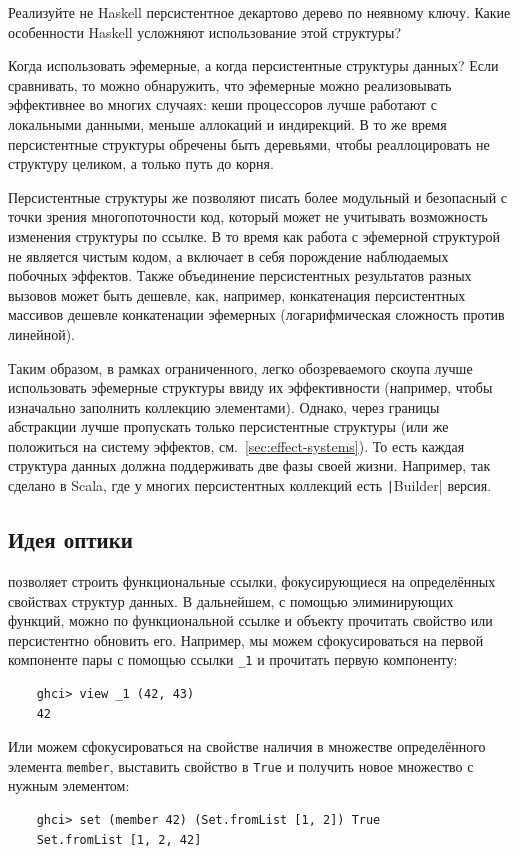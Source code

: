 \begin{task}
    Реализуйте не Haskell персистентное декартово дерево по неявному ключу.
    Какие особенности Haskell усложняют использование этой структуры?
\end{task}

Когда использовать эфемерные, а когда персистентные структуры данных?
Если сравнивать, то можно обнаружить, что эфемерные можно реализовывать эффективнее во многих случаях: кеши процессоров лучше работают с локальными данными, меньше аллокаций и индирекций.
В то же время персистентные структуры обречены быть деревьями, чтобы реаллоцировать не структуру целиком, а только путь до корня.

Персистентные структуры же позволяют писать более модульный и безопасный с точки зрения многопоточности код, который может не учитывать возможность изменения структуры по ссылке.
В то время как работа с эфемерной структурой не является чистым кодом, а включает в себя порождение наблюдаемых побочных эффектов.
Также объединение персистентных результатов разных вызовов может быть дешевле, как, например, конкатенация персистентных массивов дешевле конкатенации эфемерных (логарифмическая сложность против линейной).

Таким образом, в рамках ограниченного, легко обозреваемого скоупа лучше использовать эфемерные структуры ввиду их эффективности (например, чтобы изначально заполнить коллекцию элементами).
Однако, через границы абстракции лучше пропускать только персистентные структуры (или же положиться на систему эффектов, см.~\ref{sec:effect-systems}).
То есть каждая структура данных должна поддерживать две фазы своей жизни.
Например, так сделано в Scala, где у многих персистентных коллекций есть \texttt|Builder| версия.

\subsection{Идея оптики}

 позволяет строить функциональные ссылки, фокусирующиеся на определённых свойствах структур данных.
В дальнейшем, с помощью элиминирующих функций, можно по функциональной ссылке и объекту прочитать свойство или персистентно обновить его.
Например, мы можем сфокусироваться на первой компоненте пары с помощью ссылки \texttt{\_1} и прочитать первую компоненту:
\begin{verbatim}
    ghci> view _1 (42, 43)
    42
\end{verbatim}
Или можем сфокусироваться на свойстве наличия в множестве определённого элемента \texttt{member}, выставить свойство в \texttt{True} и получить новое множество с нужным элементом:
\begin{verbatim}
    ghci> set (member 42) (Set.fromList [1, 2]) True
    Set.fromList [1, 2, 42]
\end{verbatim}

